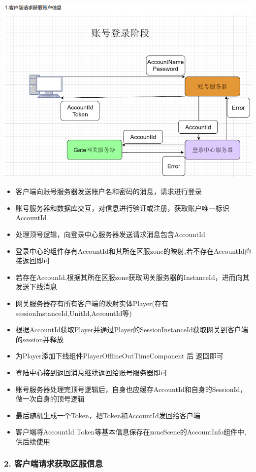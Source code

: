 \documentclass[9pt, b5paper]{article}
\begin{document}
\includegraphics[width=.9\linewidth]{./pic/readme_20230124_103209.png}
\begin{itemize}
\item 客户端向账号服务器发送账户名和密码的消息，请求进行登录
\item 账号服务器和数据库交互，对信息进行验证或注册，获取账户唯一标识AccountId
\item 处理顶号逻辑，向登录中心服务器发送请求消息包含AccountId
\item 登录中心的组件存有AccountId和其所在区服zone的映射,若不存在AccountId直接返回即可
\item 若存在AccounId,根据其所在区服zone获取网关服务器的InstanceId，进而向其发送下线消息
\item 网关服务器存有所有客户端的映射实体Player(存有sessionInstanceId,UnitId,AccountId等)
\item 根据AccountId获取Player并通过Player的SessionInstanceId获取网关到客户端的session并释放
\item 为Player添加下线组件PlayerOfflineOutTimeComponent 后 返回即可
\item 登陆中心接到返回消息继续返回给账号服务器即可
\item 账号服务器处理完顶号逻辑后，自身也应缓存AccountId和自身的SessionId，做一次自身的顶号逻辑
\item 最后随机生成一个Token，把Token和AccountId发回给客户端
\item 客户端将AccountId Token等基本信息保存在zoneScene的AccountInfo组件中,供后续使用
\end{itemize}
\subsubsection{2. 客户端请求获取区服信息}
\label{sec-3-1-2}
\end{document}
